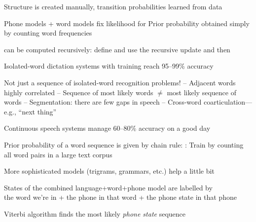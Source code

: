 \documentclass{article}
\begin{document}
\begin{huge}
Structure is created manually, transition probabilities learned from data




Phone models + word models fix likelihood  for 
\mat{\[
P(word|e_{1:t}) = \alpha P(e_{1:t}|word) P(word)
\]}%
Prior probability  obtained simply by counting word frequencies

 can be computed recursively: define
\mat{\[
  \bell_{1:t}\eq \pv(\X_t,\e_{1:t})
\]}%
and use the recursive update
\mat{\[
  \bell_{1:t+1} = \noprog{Forward}(\ell_{1:t},\e_{t+1})
\]}%
and then 

Isolated-word dictation systems with training reach 95--99\% accuracy



Not just a sequence of isolated-word recognition problems!\al
-- Adjacent words highly correlated\al
-- Sequence of most likely words $\neq$ most likely sequence of words\al
-- Segmentation: there are few gaps in speech\al
-- Cross-word coarticulation---e.g., ``next thing''

Continuous speech systems manage 60--80\% accuracy on a good day



Prior probability of a word sequence is given by chain rule:
\mat{\[
P(w_{1}\cdots w_{n}) = \prod_{i=1}^{n} P(w_i|w_{1}\cdots w_{i-1})
\]}%
:
%
Train by counting all word pairs in a large text corpus

More sophisticated models (trigrams, grammars, etc.) help a little bit





States of the combined language+word+phone model are labelled by\\
the word we're in + the phone in that word + the phone state in that phone

Viterbi algorithm finds the most likely \emph{phone state} sequence


\end{huge}
\end{document}
